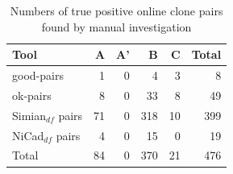 \documentclass{sig-alternate-05-2015}
\begin{document}
\begin{table}[H]
	\centering
	\caption{Numbers of true positive online clone pairs found by manual investigation}
	\label{tab:classification_true_pairs_summary}
	\small
	\begin{tabular}{l|r|r|r|r|r}
		\hline 
		Tool & A & A' & B & C & Total \\
		\hline
		good-pairs & 1 & 0 & 4 & 3 & 8 \\
		ok-pairs & 8 & 0 & 33 & 8 & 49 \\
		Simian$_{df}$ pairs & 71 & 0 & 318 & 10 & 399 \\
		NiCad$_{df}$ pairs & 4 & 0 & 15 & 0 & 19 \\
		\hline 
		Total & 84 & 0 & 370 & 21 & 476 \\
		\hline
	\end{tabular} 
\end{table}
\end{document}
